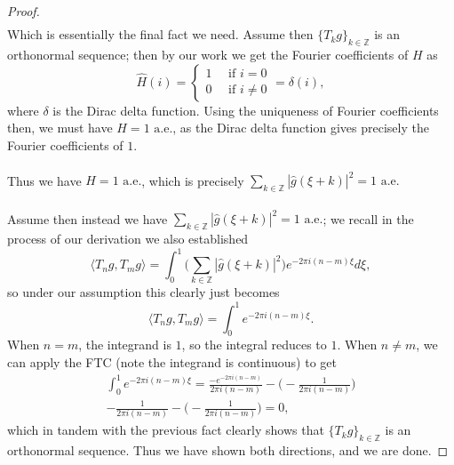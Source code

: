\documentclass[12pt]{article}
\newenvironment{ex}[2][Exercise]{\begin{trivlist}
\item[\hskip \labelsep {\bfseries #1}\hskip \labelsep {\bfseries #2.}]}{\end{trivlist}}
\begin{document}
\begin{ex}{12}
\begin{proof}
\begin{align*}
        \end{align*}
        Which is essentially the final fact we need. Assume then $\{T_kg\}_{k \in \mathbb{Z}}$ is an orthonormal sequence; then by our work we get the Fourier coefficients of $H$ as 
        \begin{equation*}\hat{H}(i) = \begin{cases}
            1 \quad \text{ if } i = 0 \\
            0 \quad \text{ if } i \neq 0 
        \end{cases} = \delta(i), \end{equation*}
        where $\delta$ is the Dirac delta function. Using the uniqueness of Fourier coefficients then, we must have $H = 1 \text{ a.e.}$, as the Dirac delta function gives precisely the Fourier coefficients of $1$. \\ \\
        Thus we have $H = 1 \text{ a.e.}$, which is precisely $\sum_{k \in \mathbb{Z}} |\hat{g}(\xi + k)|^2 = 1 \text{ a.e.}$ \\ \\
        Assume then instead we have $\sum_{k \in \mathbb{Z}} |\hat{g}(\xi + k)|^2 = 1 \text{ a.e.}$; we recall in the process of our derivation we also established
        $$\langle T_ng, T_mg \rangle = \int_0^1 \Big ( \sum_{k \in \mathbb{Z}} |\hat{g}(\xi + k)|^2 \Big)e^{-2\pi i(n - m)\xi} d\xi,$$
        so under our assumption this clearly just becomes 
        $$\langle T_ng, T_mg \rangle = \int_0^1 e^{-2\pi i(n - m)\xi}.$$
        When $n = m$, the integrand is $1$, so the integral reduces to $1$. When $n \neq m$, we can apply the FTC (note the integrand is continuous) to get
        \begin{align*}\int_0^1 e^{-2\pi i(n - m)\xi} = \frac{-e^{-2\pi i (n - m)}}{2 \pi i (n -m)} - \Bigg ( - \frac{1}{2\pi i (n-m)} \Bigg) \\
            - \frac{1}{2\pi i (n-m)} - \Bigg ( - \frac{1}{2\pi i (n-m)} \Bigg ) = 0,
        \end{align*}
        which in tandem with the previous fact clearly shows that $\{T_kg\}_{k \in \mathbb{Z}}$ is an orthonormal sequence. Thus we have shown both directions, and we are done.
    \end{proof}
\end{ex}
\end{document}
